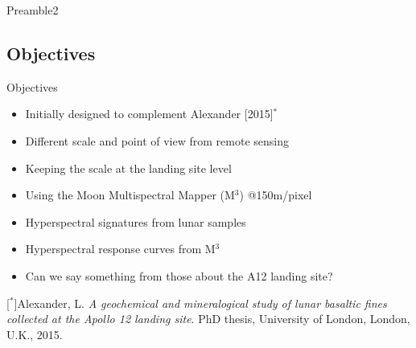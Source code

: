 \documentclass[aspectratio=169,unknownkeysallowed,xcolor=dvipsnames,beamer]{beamer} %
\begin{document}
{
\begin{frame}[plain]
\end{frame}}
\begin{frame}[fragile]{Preamble2}
\subsection{Objectives}
\begin{block}{Objectives}
\begin{itemize}
\item Initially designed to complement Alexander [2015]$^*$
\item Different scale and point of view from remote sensing
\item Keeping the scale at the landing site level
\item Using the Moon Multispectral Mapper (M$^3$) @150m/pixel
\end{itemize}
\end{block}
\begin{block}{}
\begin{itemize}
\item Hyperspectral signatures from lunar samples
\item Hyperspectral response curves from M$^3$
\item Can we say something from those about the A12 landing site?
\end{itemize}
\end{block}
[$^*$]{\small Alexander, L. \textit{A geochemical and mineralogical study of lunar basaltic fines collected at the Apollo 12 landing site}. PhD thesis, University of London, London, U.K.,
2015.}
\end{frame}
\end{document}
